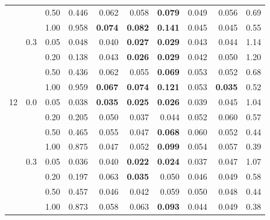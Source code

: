 \begin{table}[htbp]
\begin{tabular}{lrrrrrrrrr}
 &  & 0.50 & 0.446 & 0.062 & 0.058 & \textbf{0.079} & 0.049 & 0.056 & 0.69 \\
 &  & 1.00 & 0.958 & \textbf{0.074} & \textbf{0.082} & \textbf{0.141} & 0.045 & 0.045 & 0.55 \\
\addlinespace
8 & 0.3 & 0.05 & 0.048 & 0.040 & \textbf{0.027} & \textbf{0.029} & 0.043 & 0.044 & 1.14 \\
 &  & 0.20 & 0.138 & 0.043 & \textbf{0.026} & \textbf{0.029} & 0.042 & 0.050 & 1.20 \\
 &  & 0.50 & 0.436 & 0.062 & 0.055 & \textbf{0.069} & 0.053 & 0.052 & 0.68 \\
 &  & 1.00 & 0.959 & \textbf{0.067} & \textbf{0.074} & \textbf{0.121} & 0.053 & \textbf{0.035} & 0.52 \\
\midrule
12 & 0.0 & 0.05 & 0.038 & \textbf{0.035} & \textbf{0.025} & \textbf{0.026} & 0.039 & 0.045 & 1.04 \\
 &  & 0.20 & 0.205 & 0.050 & 0.037 & 0.044 & 0.052 & 0.060 & 0.57 \\
 &  & 0.50 & 0.465 & 0.055 & 0.047 & \textbf{0.068} & 0.060 & 0.052 & 0.44 \\
 &  & 1.00 & 0.875 & 0.047 & 0.052 & \textbf{0.099} & 0.054 & 0.057 & 0.39 \\
\addlinespace
12 & 0.3 & 0.05 & 0.036 & 0.040 & \textbf{0.022} & \textbf{0.024} & 0.037 & 0.047 & 1.07 \\
 &  & 0.20 & 0.197 & 0.063 & \textbf{0.035} & 0.050 & 0.046 & 0.049 & 0.58 \\
 &  & 0.50 & 0.457 & 0.046 & 0.042 & 0.059 & 0.050 & 0.048 & 0.44 \\
 &  & 1.00 & 0.873 & 0.058 & 0.063 & \textbf{0.093} & 0.044 & 0.049 & 0.38 \\
\bottomrule
\end{tabular}
\end{table}
